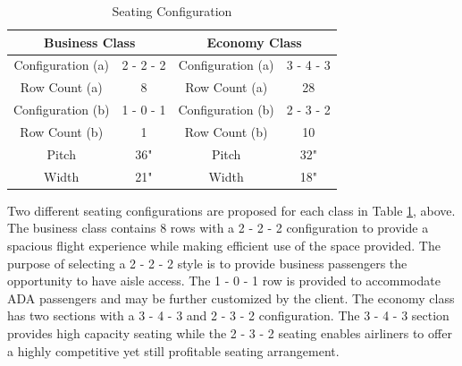 \begin{table}[!h]
    \centering
    \caption{Seating Configuration}
    \begin{tabular}{|c|c||c|c|} \toprule
        \multicolumn{2}{c}{\textbf{Business Class}} & \multicolumn{2}{c}{\textbf{Economy Class}} \\ \hline
        Configuration (a) & 2 - 2 - 2 & Configuration (a) & 3 - 4 - 3 \\ \hline
        Row Count (a) & 8 & Row Count (a) & 28 \\ \hline
        Configuration (b) & 1 - 0 - 1 & Configuration (b) & 2 - 3 - 2 \\ \hline
        Row Count (b) & 1 & Row Count (b) & 10 \\ \hline
        Pitch & 36" & Pitch & 32" \\ \hline
        Width & 21" & Width & 18" \\ \bottomrule
    \end{tabular}
    \label{tab:seating}
\end{table}
 
Two different seating configurations are proposed for each class in Table \ref{tab:seating}, above.  The business class contains 8 rows with a 2 - 2 - 2 configuration to provide a spacious flight experience while making efficient use of the space provided.  The purpose of selecting a 2 - 2 - 2 style is to provide business passengers the opportunity to have aisle access.  The 1 - 0 - 1 row is provided to accommodate ADA passengers and may be further customized by the client.  The economy class has two sections with a 3 - 4 - 3 and 2 - 3 - 2 configuration.  The 3 - 4 - 3 section provides high capacity seating while the 2 - 3 - 2 seating enables airliners to offer a highly competitive yet still profitable seating arrangement.




